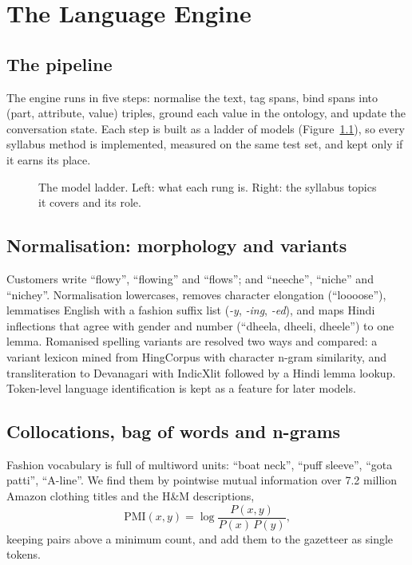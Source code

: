 \chapter{The Language Engine}\label{ch:lang}

\section{The pipeline}

The engine runs in five steps: normalise the text, tag spans, bind spans into (part, attribute, value) triples, ground each value in the ontology, and update the conversation state. Each step is built as a ladder of models (Figure~\ref{fig:ladder}), so every syllabus method is implemented, measured on the same test set, and kept only if it earns its place.

\begin{figure}[h]
\centering
\caption{The model ladder. Left: what each rung is. Right: the syllabus topics it covers and its role.}\label{fig:ladder}
\end{figure}

\section{Normalisation: morphology and variants}

Customers write ``flowy'', ``flowing'' and ``flows''; and ``neeche'', ``niche'' and ``nichey''. Normalisation lowercases, removes character elongation (``loooose''), lemmatises English with a fashion suffix list (\emph{-y}, \emph{-ing}, \emph{-ed}), and maps Hindi inflections that agree with gender and number (``dheela, dheeli, dheele'') to one lemma. Romanised spelling variants are resolved two ways and compared: a variant lexicon mined from HingCorpus with character n-gram similarity, and transliteration to Devanagari with IndicXlit followed by a Hindi lemma lookup. Token-level language identification is kept as a feature for later models.

\section{Collocations, bag of words and n-grams}

Fashion vocabulary is full of multiword units: ``boat neck'', ``puff sleeve'', ``gota patti'', ``A-line''. We find them by pointwise mutual information over 7.2 million Amazon clothing titles and the H\&M descriptions,
\begin{equation}
\mathrm{PMI}(x,y) = \log \frac{P(x,y)}{P(x)\,P(y)},
\end{equation}
keeping pairs above a minimum count, and add them to the gazetteer as single tokens.

